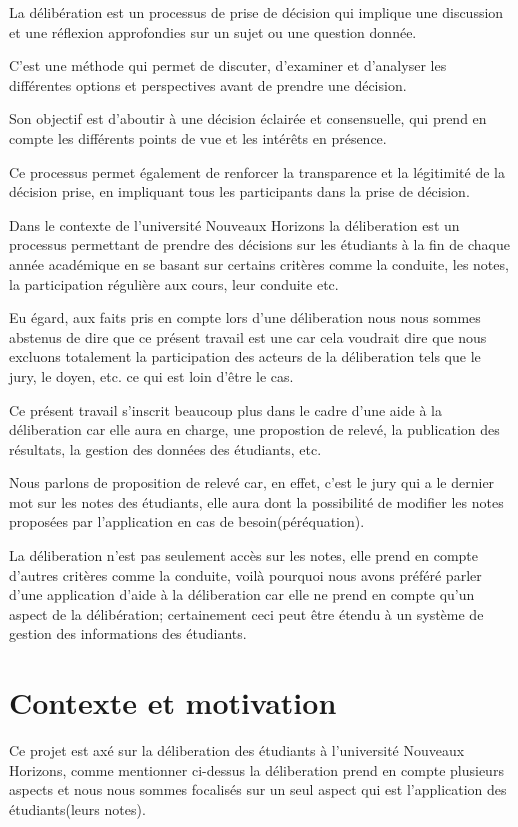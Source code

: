 La délibération est un processus de prise de décision qui
implique une discussion et une réflexion approfondies sur
un sujet ou une question donnée.

C'est une méthode qui permet de discuter, d'examiner
et d'analyser les différentes options
et perspectives avant de prendre une décision.

Son objectif est d'aboutir à une décision
éclairée et consensuelle, qui prend en compte les différents
points de vue et les intérêts en présence.

Ce processus permet également de renforcer la transparence et
la légitimité de la décision prise, en impliquant tous
les participants dans la prise de décision.

Dans le contexte de l'université Nouveaux Horizons la déliberation
est un processus permettant de prendre des décisions sur les étudiants
à la fin de chaque année académique en se basant sur certains critères comme la conduite,
les notes, la participation régulière aux cours, leur conduite etc.

Eu égard, aux faits pris en compte lors d'une déliberation nous nous sommes abstenus de dire que ce présent travail
est une  car
cela voudrait dire que nous excluons totalement la participation des acteurs de la déliberation tels que le jury, le doyen, etc.
ce qui est loin d'être le cas.

Ce présent travail s'inscrit beaucoup plus dans le cadre d'une aide à la déliberation car elle aura en charge, une propostion de relevé, la publication des résultats, la gestion des données des étudiants, etc.

Nous parlons de proposition de relevé car, en effet, c'est le jury qui a le dernier mot sur les notes des étudiants, elle aura dont la
possibilité de modifier les notes proposées par l'application en cas de besoin(péréquation).

La déliberation n'est pas seulement accès sur les notes, elle prend en compte d'autres critères comme la conduite, voilà pourquoi nous avons
préféré parler d'une application d'aide à la déliberation car elle ne prend en compte qu'un aspect de la délibération;
certainement ceci peut être étendu à un système de gestion des informations des étudiants.

\section{Contexte et motivation}\label{sec:contexte-et-motivation}
Ce projet est axé sur la déliberation des étudiants à l'université Nouveaux Horizons,
comme mentionner ci-dessus la déliberation prend en compte plusieurs aspects
et nous nous sommes focalisés sur un seul aspect qui est l'application des étudiants(leurs notes).


